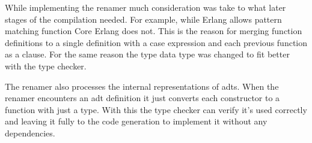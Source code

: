 While implementing the renamer much consideration was take to what later stages of the compilation needed. For example, while Erlang allows pattern matching function Core Erlang does not. This is the reason for merging function definitions to a single definition with a case expression and each previous function as a clause. For the same reason the type data type was changed to fit better with the type checker.

The renamer also processes the internal representations of \glspl{adt}. When the renamer encounters an \gls{adt} definition it just converts each constructor to a function with just a type. With this the type checker can verify it's used correctly and leaving it fully to the code generation to implement it without any dependencies. 
